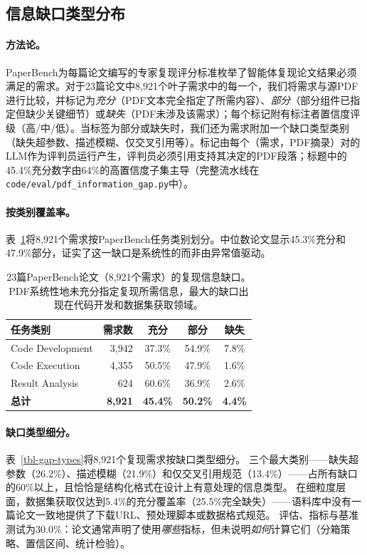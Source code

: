 \subsection{信息缺口类型分布}
\label{sec-gap-types}

\paragraph{方法论。}
PaperBench为每篇论文编写的专家复现评分标准枚举了智能体复现论文结果必须满足的需求。对于23篇论文中8{,}921个叶子需求中的每一个，我们将需求与源PDF进行比较，并标记为\emph{充分}（PDF文本完全指定了所需内容）、\emph{部分}（部分组件已指定但缺少关键细节）或\emph{缺失}（PDF未涉及该需求）；每个标记附有标注者置信度评级（高/中/低）。当标签为部分或缺失时，我们还为需求附加一个缺口类型类别（缺失超参数、描述模糊、仅交叉引用等）。标记由每个（需求，PDF摘录）对的LLM作为评判员运行产生，评判员必须引用支持其决定的PDF段落；标题中的45.4\%充分数字由64\%的高置信度子集主导（完整流水线在\texttt{code/eval/pdf\_information\_gap.py}中）。

\paragraph{按类别覆盖率。}
表~\ref{tbl-info-gap}将8{,}921个需求按PaperBench任务类别划分。中位数论文显示45.3\%充分和47.9\%部分，证实了这一缺口是系统性的而非由异常值驱动。

\begin{table}[h]
\centering
\small
\setlength{\tabcolsep}{4pt}
\begin{tabular}{lrccc}
\toprule
\textbf{任务类别} & \textbf{需求数} & \textbf{充分} & \textbf{部分} & \textbf{缺失} \\
\midrule
Code Development       & 3,942 & 37.3\% & 54.9\% & 7.8\% \\
Code Execution         & 4,355 & 50.5\% & 47.9\% & 1.6\% \\
Result Analysis        &   624 & 60.6\% & 36.9\% & 2.6\% \\
\midrule
\textbf{总计}          & \textbf{8,921} & \textbf{45.4\%} & \textbf{50.2\%} & \textbf{4.4\%} \\
\bottomrule
\end{tabular}
\caption{23篇PaperBench论文（8,921个需求）的复现信息缺口。PDF系统性地未充分指定复现所需信息，最大的缺口出现在代码开发和数据集获取领域。}
\label{tbl-info-gap}
\end{table}

\paragraph{缺口类型细分。}
表~\ref{tbl-gap-types}将8,921个复现需求按缺口类型细分。
三个最大类别——缺失超参数（26.2\%）、描述模糊（21.9\%）和仅交叉引用规范（13.4\%）——占所有缺口的60\%以上，且恰恰是结构化格式在设计上有意处理的信息类型。
在细粒度层面，数据集获取仅达到5.4\%的充分覆盖率（25.5\%完全缺失）——语料库中没有一篇论文一致地提供了下载URL、预处理脚本或数据格式规范。
评估、指标与基准测试为30.0\%：论文通常声明了使用\emph{哪些}指标，但未说明\emph{如何}计算它们（分箱策略、置信区间、统计检验）。

